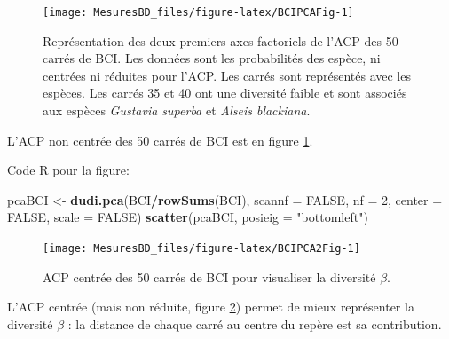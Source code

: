 \documentclass[
  11pt,
  french,
  a4paper,
  extrafontsizes,onecolumn,openright
  ]{memoir}
\newenvironment{Shaded}{\begin{snugshade}}{\end{snugshade}}
\newcommand{\DataTypeTok}[1]{\textcolor[rgb]{0.13,0.29,0.53}{#1}}
\newcommand{\DecValTok}[1]{\textcolor[rgb]{0.00,0.00,0.81}{#1}}
\newcommand{\KeywordTok}[1]{\textcolor[rgb]{0.13,0.29,0.53}{\textbf{#1}}}
\newcommand{\NormalTok}[1]{#1}
\newcommand{\OperatorTok}[1]{\textcolor[rgb]{0.81,0.36,0.00}{\textbf{#1}}}
\newcommand{\OtherTok}[1]{\textcolor[rgb]{0.56,0.35,0.01}{#1}}
\newcommand{\StringTok}[1]{\textcolor[rgb]{0.31,0.60,0.02}{#1}}
\begin{document}
\scriptsize

\begin{figure}

{\centering \texttt{[image: MesuresBD\_files/figure-latex/BCIPCAFig-1]} 

}

\caption{Représentation des deux premiers axes factoriels de l'ACP des 50 carrés de BCI. Les données sont les probabilités des espèce, ni centrées ni réduites pour l'ACP. Les carrés sont représentés avec les espèces. Les carrés 35 et 40 ont une diversité faible et sont associés aux espèces \emph{Gustavia superba} et \emph{Alseis blackiana}.}\label{fig:BCIPCAFig}
\end{figure}

\normalsize

L'ACP non centrée des 50 carrés de BCI est en figure \ref{fig:BCIPCAFig}.

Code R pour la figure:

\scriptsize

\begin{Shaded}
\begin{Highlighting}[]
\NormalTok{pcaBCI <-}\StringTok{ }\KeywordTok{dudi.pca}\NormalTok{(BCI}\OperatorTok{/}\KeywordTok{rowSums}\NormalTok{(BCI), }\DataTypeTok{scannf =} \OtherTok{FALSE}\NormalTok{, }\DataTypeTok{nf =} \DecValTok{2}\NormalTok{,}
    \DataTypeTok{center =} \OtherTok{FALSE}\NormalTok{, }\DataTypeTok{scale =} \OtherTok{FALSE}\NormalTok{)}
\KeywordTok{scatter}\NormalTok{(pcaBCI, }\DataTypeTok{posieig =} \StringTok{"bottomleft"}\NormalTok{)}
\end{Highlighting}
\end{Shaded}

\normalsize



\scriptsize

\begin{figure}

{\centering \texttt{[image: MesuresBD\_files/figure-latex/BCIPCA2Fig-1]} 

}

\caption{ACP centrée des 50 carrés de BCI pour visualiser la diversité \(\beta\).}\label{fig:BCIPCA2Fig}
\end{figure}

\normalsize

L'ACP centrée (mais non réduite, figure \ref{fig:BCIPCA2Fig}) permet de mieux représenter la diversité \(\beta\) : la distance de chaque carré au centre du repère est sa contribution.
\end{document}

